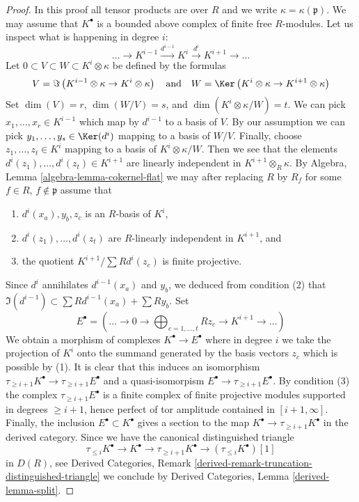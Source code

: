 \begin{proof}
In this proof all tensor products are over $R$ and we write
$\kappa = \kappa(\mathfrak p)$. We may assume that $K^\bullet$
is a bounded above complex of finite free $R$-modules. Let us
inspect what is happening in degree $i$:
$$
\ldots \to K^{i - 1} \xrightarrow{d^{i - 1}} K^i \xrightarrow{d^i}
K^{i + 1} \to \ldots
$$
Let $0 \subset V \subset W \subset K^i \otimes \kappa$ be defined
by the formulas
$$
V = \Im\left(
K^{i - 1} \otimes \kappa \to K^i \otimes \kappa
\right)
\quad\text{and}\quad
W = \Ker\left(
K^i \otimes \kappa \to K^{i + 1} \otimes \kappa
\right)
$$
Set $\dim(V) = r$, $\dim(W/V) = s$, and $\dim(K^i \otimes \kappa/W) = t$.
We can pick $x_1, \ldots, x_r \in K^{i - 1}$ which map by $d^{i - 1}$
to a basis of $V$. By our assumption we can pick
$y_1, \ldots, y_s \in \Ker(d^i)$ mapping to a basis of $W/V$.
Finally, choose $z_1, \ldots, z_t \in K^i$ mapping to a basis of
$K^i \otimes \kappa/W$. Then we see that the elements
$d^i(z_1), \ldots, d^i(z_t) \in K^{i + 1}$ are linearly independent
in $K^{i + 1} \otimes_R \kappa$.
By Algebra, Lemma \ref{algebra-lemma-cokernel-flat} we may after replacing
$R$ by $R_f$ for some $f \in R$, $f \not \in \mathfrak p$ assume that
\begin{enumerate}
\item $d^i(x_a), y_b, z_c$ is an $R$-basis of $K^i$,
\item $d^i(z_1), \ldots, d^i(z_t)$ are $R$-linearly independent in
$K^{i + 1}$, and
\item the quotient $K^{i + 1}/\sum Rd^i(z_c)$ is finite projective.
\end{enumerate}
Since $d^i$ annihilates $d^{i-1}(x_a)$ and $y_b$, we deduced from
condition (2) that $\Im(d^{i - 1}) \subset \sum Rd^{i-1}(x_a) + \sum Ry_b$.
Set
$$
E^\bullet =  (\ldots \to 0 \to
\bigoplus\nolimits_{c = 1, \ldots, t} Rz_c \to K^{i + 1} \to \ldots)
$$
We obtain a morphism of complexes $K^\bullet \to E^\bullet$
where in degree $i$ we take the projection of $K^i$ onto the summand
generated by the basis vectors $z_c$ which is possible by (1).
It is clear that this induces
an isomorphism $\tau_{\geq i + 1}K^\bullet \to \tau_{\geq i + 1}E^\bullet$
and a quasi-isomorpism $E^\bullet \to \tau_{\geq i + 1}E^\bullet$.
By condition (3) the complex $\tau_{\geq i + 1}E^\bullet$ is a finite
complex of finite projective modules supported in degrees $\geq i + 1$,
hence perfect of tor amplitude contained in $[i + 1, \infty]$.
Finally, the inclusion $E^\bullet \subset K^\bullet$ gives a section
to the map $K^\bullet \to \tau_{\geq i + 1}K^\bullet$ in the derived
category. Since we have the canonical distinguished triangle
$$
\tau_{\leq i}K^\bullet \to K^\bullet \to \tau_{\geq i + 1}K^\bullet \to
(\tau_{\leq i}K^\bullet)[1]
$$
in $D(R)$, see Derived Categories, Remark
\ref{derived-remark-truncation-distinguished-triangle} we conclude by
Derived Categories, Lemma \ref{derived-lemma-split}.
\end{proof}

